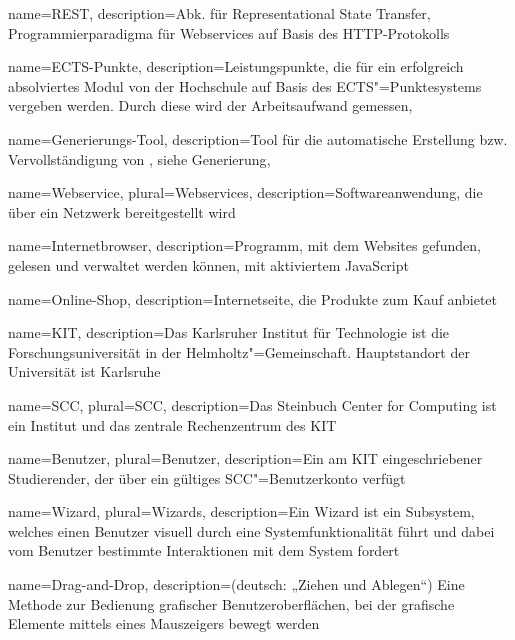 %
%
%
%
{
	name=REST,
	description={Abk. für Representational State Transfer, Programmierparadigma für \glspl{Webservice} auf Basis des HTTP-Protokolls}
}

{
	name=ECTS-Punkte,
	description={Leistungspunkte, die für ein erfolgreich absolviertes \gls{Modul} von der Hochschule auf Basis des ECTS"=Punktesystems vergeben werden. Durch diese wird der Arbeitsaufwand gemessen},
}

{
	name=Generierungs-Tool,
	description={Tool für die automatische Erstellung bzw. Vervollständigung von , siehe \gls{Generierung}},
}


{
	name=Webservice,
	plural=Webservices,
	description={Softwareanwendung, die über ein Netzwerk bereitgestellt wird}
}

{
	name={Internetbrowser},
	description={Programm, mit dem Websites gefunden, gelesen und verwaltet werden können, mit aktiviertem JavaScript}
}

{
	name={Online-Shop},
	description={Internetseite, die Produkte zum Kauf anbietet}
}

{
	name=KIT,
	description={Das Karlsruher Institut für Technologie ist die Forschungsuniversität in der Helmholtz"=Gemeinschaft. Hauptstandort der Universität ist Karlsruhe}
}

{
	name=SCC,
	plural=SCC,
	description={Das Steinbuch Center for Computing ist ein Institut und das zentrale Rechenzentrum des \gls{KIT}}
}

{
	name=Benutzer,
	plural=Benutzer,
	description={Ein am \gls{KIT} eingeschriebener Studierender, der über ein gültiges \gls{SCC}"=Benutzerkonto verfügt}
}

{
	name=Wizard,
	plural=Wizards,
	description={Ein Wizard ist ein Subsystem, welches einen \gls{Benutzer} visuell durch eine Systemfunktionalität führt und dabei vom \gls{Benutzer} bestimmte Interaktionen mit dem System fordert}
}

{
	name=Drag-and-Drop,
	description={(deutsch: „Ziehen und Ablegen“) Eine Methode zur Bedienung grafischer Benutzeroberflächen, bei der grafische Elemente mittels eines Mauszeigers bewegt werden}
}

